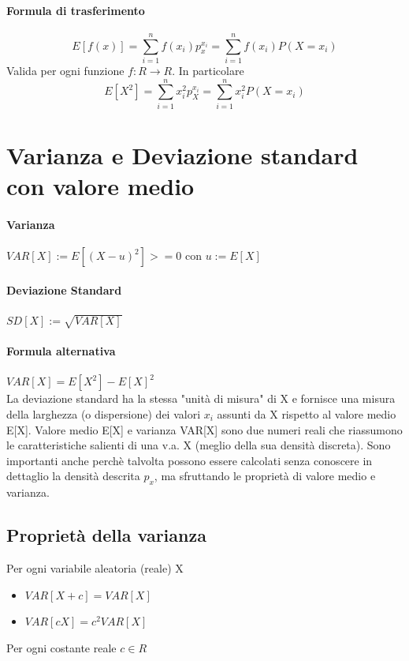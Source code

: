\documentclass[12pt, a4paper, openany]{book}
\begin{document}
\paragraph{Formula di trasferimento} 

\begin{equation}
    E[f(x)] = \sum_{i = 1}^{n} f(x_i)p_x^{x_i}
= \sum_{i = 1}^{n}f(x_i)P(X = x_i)
\end{equation}
Valida per ogni funzione $f:R \to R$. In particolare
\begin{equation}
    E[X^2] = \sum_{i = 1}^{n} x_i^2 p_X^{x_i} = \sum_{i = 1}^{n} x_i^2P(X=x_i)
\end{equation}

\section{Varianza e Deviazione standard con valore medio}
\paragraph{Varianza} $VAR[X] := E[(X-u)^2] >= 0$ con $u:=E[X]$
\paragraph{Deviazione Standard} $SD[X] := \sqrt{VAR[X]}$
\paragraph{Formula alternativa} $VAR[X] = E[X^2] - E[X]^2$
\\ La deviazione standard ha la stessa "unità di misura" di X e fornisce 
una misura della larghezza (o dispersione) dei valori $x_i$ assunti da X rispetto
al valore medio E[X].
Valore medio E[X] e varianza VAR[X] sono due numeri reali che riassumono
le caratteristiche salienti di una v.a. X (meglio della sua densità discreta).
Sono importanti anche perchè talvolta possono essere calcolati
senza conoscere in dettaglio la densità descrita $p_x$, ma sfruttando le
proprietà di valore medio e varianza.

\subsection{Proprietà della varianza}
Per ogni variabile aleatoria (reale) X
\begin{itemize}
    \item $VAR[X+c] = VAR[X]$
    \item $VAR[cX] = c^2 VAR[X]$
\end{itemize}
Per ogni costante reale $c \in R$
\end{document}

